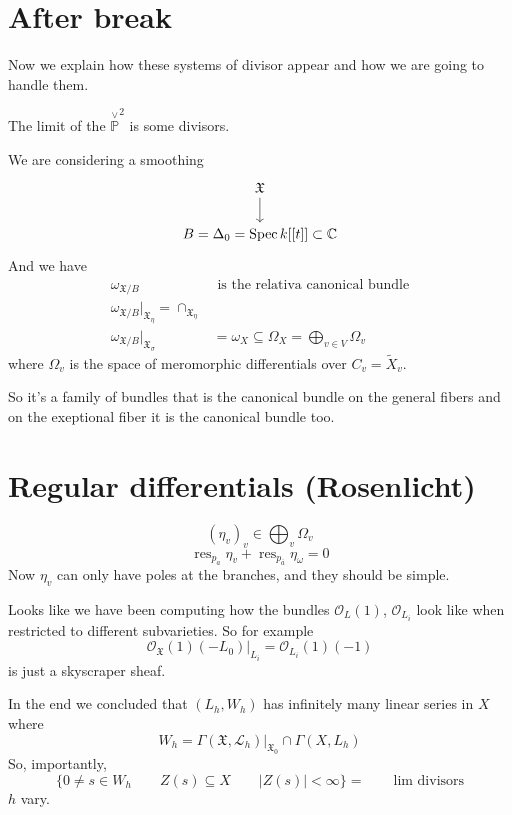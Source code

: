 \section{After break}

Now we explain how these systems of divisor appear and how we are going to handle them.

The limit of the $\overset{\vee }{\mathbb{P}}^2$ is some divisors.

We are considering a smoothing
\[\begin{tikzcd}
	\mathfrak{X}\arrow[d]\\
B= \Delta_0= \operatorname{Spec}k[[t]]\subset \mathbb{C}
\end{tikzcd}\]
And we have
\begin{align*}
	\omega_{\mathfrak{X} /B}&\text{ is the relativa canonical bundle}\\
	\omega_{\mathfrak{X} /B}\Big|_{\mathfrak{X}_\eta}=\cap_{\mathfrak{X}_\eta}\\
	\omega_{\mathfrak{X} /B}\Big|_{\mathfrak{X}_\sigma}&=\omega_{X}\subseteq \Omega_X=\bigoplus_{v\in V}\Omega_v  
\end{align*}
where $\Omega_v$ is the space of meromorphic differentials over $C_v=\tilde{X}_v$.

So it's a family of bundles that is the canonical bundle on the general fibers and on the exeptional fiber it is the canonical bundle too.

\section{Regular differentials (Rosenlicht)}

\[(\eta_v)_{v}\in\bigoplus_{v}\Omega_v  \]
\[\operatorname{res}_{p_a}\eta_v+\operatorname{res}_{p_{\bar{a}}}\eta_\omega =0\]
Now $\eta_v$ can only have poles at the branches, and they should be simple.

\begin{remark}
	Looks like we have been computing how the bundles $\mathcal{O}_L(1)$, $\mathcal{O}_{L_i}$ look like when restricted to different subvarieties. So for example
\[\mathcal{O}_{\mathfrak{X}}(1)(-L_0)|_{L_i}=\mathcal{O}_{L_i}(1)(-1)\]
	is just a skyscraper sheaf.
\end{remark}

In the end we concluded that $(L_h,W_h)$ has infinitely many linear series in $X$ where
\[W_h= \Gamma(\mathfrak{X},\mathcal{L}_{h})\Big|_{\mathfrak{X}_0}\cap \Gamma(X,L_h)\]
So, importantly,
\[\{0\neq  s\in W_h\qquad Z(s)\subseteq X\qquad |Z(s)| <\infty\} =\qquad \text{lim divisors} \]
$h$ vary.

